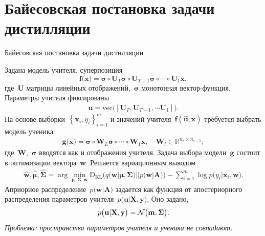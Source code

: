 \documentclass[10pt,pdf,hyperref={unicode}]{beamer}
\begin{document}
\section{Байесовская постановка задачи дистилляции}
\begin{frame}{Байесовская постановка задачи дистилляции}

Задана модель учителя, суперпозиция
\[
\mathbf{f}\bigr(\mathbf{x}\bigr) = \bm{\sigma} \circ \mathbf{U}_T\bm{\sigma} \circ \mathbf{U}_{T-1}\bm{\sigma} \circ \cdots \circ \mathbf{U}_1\mathbf{x},
\]
где~$\mathbf{U}$ матрицы линейных отображений,~$\bm{\sigma}$ монотонная вектор-функция. Параметры учителя фиксированы
\[
\begin{aligned}
\mathbf{u} = \text{vec}\bigr(\left[\mathbf{U}_T, \mathbf{U}_{T-1}, \cdots \mathbf{U}_1\right]\bigr).
\end{aligned}
\]
На основе выборки~$\left\{\mathbf{x}_i, y_i\right\}_{i=1}^{m}$ и значений учителя~$\mathbf{f}(\hat{\mathbf{u}},\mathbf{x})$ требуется выбрать модель ученика:
\[
\begin{aligned}
\mathbf{g}\bigr(\mathbf{x}\bigr) = \bm{\sigma} \circ \mathbf{W}_L\bm{\sigma} \circ \cdots \circ \mathbf{W}_1\mathbf{x}, \quad \mathbf{W}_l \in \mathbb{R}^{n_s \times n_{s-1}},
\end{aligned}
\]
где~$\mathbf{W}$,~$\bm{\sigma}$ вводятся как и отображения учителя. Задача выбора модели~$\mathbf{g}$ состоит в оптимизации вектора~$\mathbf{w}$.  Решается  вариационным выводом
\[
\begin{aligned}
\hat{\mathbf{w}}, \hat{\bm{\mu}}, \hat{\bm{\Sigma}} = \arg \min_{\bm{\mu}, \bm{\Sigma}, \mathbf{w}} \text{D}_{\text{KL}}\bigr(q\bigr(\mathbf{w}|\bm{\mu}, \bm{\Sigma}\bigr)||p\bigr(\mathbf{w}|\mathbf{A}\bigr)\bigr) - \sum_{i=1}^{m}\log p\bigr(y_i|\mathbf{x}_{i}, \mathbf{w}\bigr).
\end{aligned}
\]
Априорное распределение~$p\bigr(\mathbf{w}|\mathbf{A}\bigr)$ задается как функция от апостериорного распределения параметров учителя~$p\bigr(\mathbf{u}|\mathbf{X}, \mathbf{y}\bigr)$.  Оно задано,
\[
\setlength\abovedisplayskip{0pt}
\begin{aligned}
p\bigr(\mathbf{u}|\mathbf{X}, \mathbf{y}\bigr) = \mathcal{N}\bigr(\mathbf{m}, \bm{\Sigma}\bigr).
\end{aligned}
\]
{\it \color{red}Проблема: пространства параметров учителя и ученика не совпадают.}
\end{frame}
\end{document}
